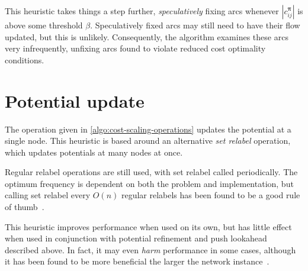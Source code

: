 This heuristic takes things a step further, \emph{speculatively} fixing arcs whenever $\left|c^{\boldsymbol{\pi}}_{ij}\right|$ is above some threshold $\beta$. Speculatively fixed arcs may still need to have their flow updated, but this is unlikely. Consequently, the algorithm examines these arcs very infrequently, unfixing arcs found to violate reduced cost optimality conditions.

\section{Potential update}
The  operation given in \cref{algo:cost-scaling-operations} updates the potential at a single node. This heuristic is based around an alternative \emph{set relabel} operation, which updates potentials at many nodes at once.

Regular relabel operations are still used, with set relabel called periodically. The optimum frequency is dependent on both the problem and implementation, but calling set relabel every $O(n)$ regular relabels has been found to be a good rule of thumb~\cite{Goldberg:1997}.

This heuristic improves performance when used on its own, but has little effect when used in conjunction with potential refinement and push lookahead described above. In fact, it may even \emph{harm} performance in some cases, although it has been found to be more beneficial the larger the network instance~\cite{Bunnagel:1998}.